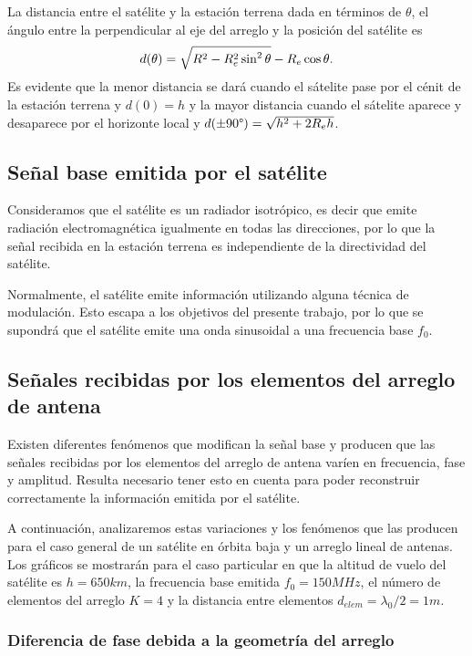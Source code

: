 \documentclass{article}
\newenvironment{standalone}{\begin{preview}}{\end{preview}}
\begin{document}
\begin{standalone}
  La distancia entre el satélite y la estación terrena dada en términos de $\theta$, el ángulo entre la perpendicular al eje del arreglo y la posición del satélite es \cite{popescu2016}
  \begin{equation}
    d(\theta) = \sqrt{ R^2 - R_e^2  \sin^2{\theta} } - R_e \cos{\theta}.
    \tagaddtext{[\si{\meter}]}
  \end{equation}
  Es evidente que la menor distancia se dará cuando el sátelite pase por el cénit de la estación terrena y $d(0) = h$ y la mayor distancia cuando el sátelite aparece y desaparece por el horizonte local y $d(\pm 90 \degree) = \sqrt{ h^2 + 2 R_e h }$.

  \subsection{Señal base emitida por el satélite}

  Consideramos que el satélite es un radiador isotrópico, es decir que emite radiación electromagnética igualmente en todas las direcciones, por lo que la señal recibida en la estación terrena es independiente de la directividad del satélite. 

  Normalmente, el satélite emite información utilizando alguna técnica de modulación. Esto escapa a los objetivos del presente trabajo, por lo que se supondrá que el satélite emite una onda sinusoidal a una frecuencia base $f_0$.

  \subsection{Señales recibidas por los elementos del arreglo de antena}

  Existen diferentes fenómenos que modifican la señal base y producen que las señales recibidas por los elementos del arreglo de antena varíen en frecuencia, fase y amplitud.
  Resulta necesario tener esto en cuenta para poder reconstruir correctamente la información emitida por el satélite.

  A continuación, analizaremos estas variaciones y los fenómenos que las producen para el caso general de un satélite en órbita baja y un arreglo lineal de antenas. Los gráficos se mostrarán para el caso particular en que la altitud de vuelo del satélite es $h = 650km$, la frecuencia base emitida $f_0 = 150MHz$, el número de elementos del arreglo $K = 4$ y la distancia entre elementos $d_{elem} = \lambda_0 / 2 = 1 m$.

  \subsubsection{Diferencia de fase debida a la geometría del arreglo}


\end{standalone}
\end{document}
